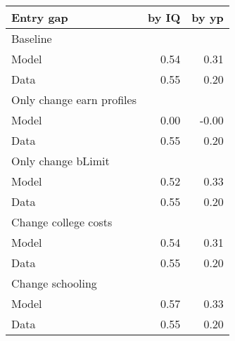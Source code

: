 \begin{tabular}{lrr}
\hline
Entry gap & by IQ  & by yp  \\ 
\hline
Baseline &   &   \\ 
Model & 0.54  & 0.31  \\ 
Data & 0.55  & 0.20  \\ 
Only change earn profiles &   &   \\ 
Model & 0.00  & -0.00  \\ 
Data & 0.55  & 0.20  \\ 
Only change bLimit &   &   \\ 
Model & 0.52  & 0.33  \\ 
Data & 0.55  & 0.20  \\ 
Change college costs &   &   \\ 
Model & 0.54  & 0.31  \\ 
Data & 0.55  & 0.20  \\ 
Change schooling &   &   \\ 
Model & 0.57  & 0.33  \\ 
Data & 0.55  & 0.20  \\ 
\hline
\end{tabular}%
